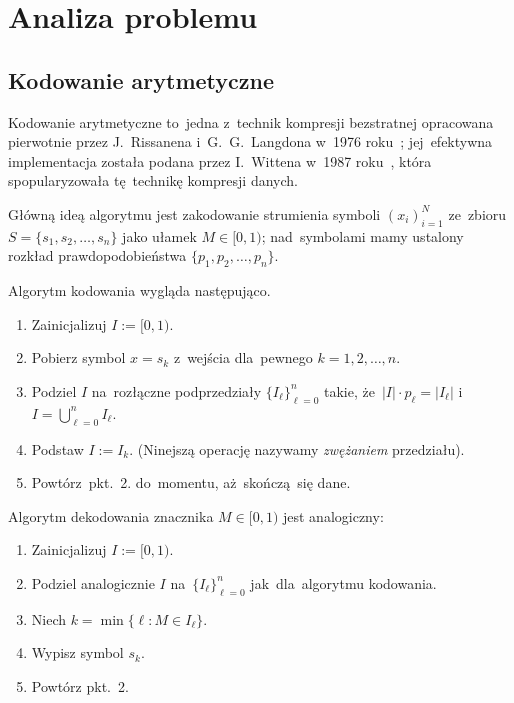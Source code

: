 \documentclass[../../thesis.tex]{subfiles}
\begin{document}
\chapter{Analiza problemu}

\section{Kodowanie arytmetyczne}

Kodowanie arytmetyczne to~jedna z~technik kompresji bezstratnej
opracowana pierwotnie przez J.~Rissanena i~G.~G.~Langdona w~1976 roku~\cite{Rissanen:AC};
jej~efektywna implementacja została podana przez I.~Wittena w~1987 roku~\cite{Witten:AC},
która spopularyzowała tę~technikę kompresji danych.

Główną ideą algorytmu jest zakodowanie strumienia symboli \( (x_i)_{i = 1}^N \)
ze~zbioru \( S = \{ s_1, s_2, \dotsc, s_n \} \) jako ułamek \( M \in [0, 1) \);
nad~symbolami mamy ustalony rozkład prawdopodobieństwa \( \{ p_1, p_2, \dotsc, p_n \} \).

Algorytm kodowania wygląda następująco.
\begin{enumerate}
  \item Zainicjalizuj \( I := [0, 1) \).
  \item Pobierz symbol \( x = s_k \) z~wejścia dla~pewnego \( k = 1, 2, \dotsc, n \).
  \item Podziel \( I \) na~rozłączne podprzedziały \( \{ I_\ell \}_{\ell = 0}^n \) takie, 
    że~\( |I| \cdot p_\ell = |I_\ell| \) i~\( I = \bigcup_{\ell = 0}^n I_\ell \).
  \item Podstaw \( I := I_k \). (Ninejszą operację nazywamy \emph{zwężaniem} przedziału).
  \item Powtórz~pkt.~2. do~momentu, aż~skończą~się dane.
\end{enumerate}

Algorytm dekodowania znacznika \( M \in [0, 1) \) jest analogiczny:
\begin{enumerate}
  \item Zainicjalizuj \( I := [0, 1) \).
  \item Podziel analogicznie \( I \) na~\( \{ I_\ell \}_{\ell = 0}^n \) 
    jak~dla~algorytmu kodowania.
  \item Niech \( k = \min \{ \ell : M \in I_\ell \} \).
  \item Wypisz symbol \( s_k \).
  \item Powtórz pkt.~2.
\end{enumerate}
\end{document}

